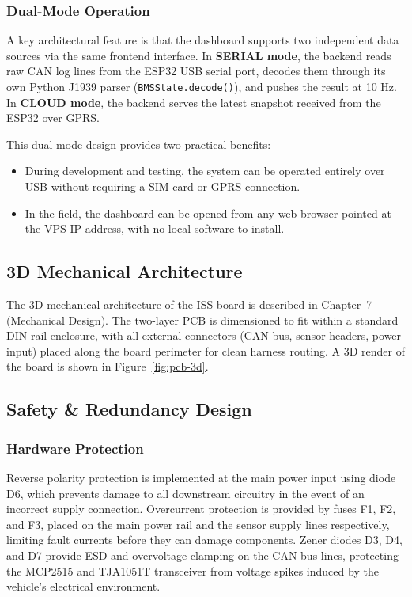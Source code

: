 \subsubsection{Dual-Mode Operation}

A key architectural feature is that the dashboard supports two independent data sources via the same frontend interface. In \textbf{SERIAL mode}, the backend reads raw CAN log lines from the ESP32 USB serial port, decodes them through its own Python J1939 parser (\texttt{BMSState.decode()}), and pushes the result at 10 Hz. In \textbf{CLOUD mode}, the backend serves the latest snapshot received from the ESP32 over GPRS.

This dual-mode design provides two practical benefits:
\begin{itemize}
    \item During development and testing, the system can be operated entirely over USB without requiring a SIM card or GPRS connection.
    \item In the field, the dashboard can be opened from any web browser pointed at the VPS IP address, with no local software to install.
\end{itemize}

\subsection{3D Mechanical Architecture}

The 3D mechanical architecture of the ISS board is described in Chapter~7 (Mechanical Design). The two-layer PCB is dimensioned to fit within a standard DIN-rail enclosure, with all external connectors (CAN bus, sensor headers, power input) placed along the board perimeter for clean harness routing. A 3D render of the board is shown in Figure~\ref{fig:pcb-3d}.

\subsection{Safety \& Redundancy Design}

\subsubsection*{Hardware Protection}

Reverse polarity protection is implemented at the main power input using diode D6, which prevents damage to all downstream circuitry in the event of an incorrect supply connection. Overcurrent protection is provided by fuses F1, F2, and F3, placed on the main power rail and the sensor supply lines respectively, limiting fault currents before they can damage components. Zener diodes D3, D4, and D7 provide ESD and overvoltage clamping on the CAN bus lines, protecting the MCP2515 and TJA1051T transceiver from voltage spikes induced by the vehicle's electrical environment.

